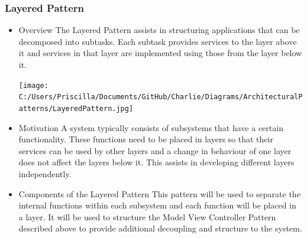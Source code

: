 \documentclass{article}
\begin{document}
\subsubsection{Layered Pattern}
\begin{itemize}
\item{Overview}
\newline
The Layered Pattern assists in structuring applications that can be decomposed into subtasks. Each subtask provides services to the layer above it and services in that layer are implemented using those from the layer below it.
\newline
\begin{minipage}{\linewidth} 
\centering
\texttt{[image: C:/Users/Priscilla/Documents/GitHub/Charlie/Diagrams/ArchitecturalPatterns/LayeredPattern.jpg]}
\end{minipage}
\item{Motivation}
\newline
A system typically consists of subsystems that have a certain functionality. These functions need to be placed in layers so that their services can be used by other layers and a change in behaviour of one layer does not affect the layers below it. This assists in developing different layers independently. 

\item{Components of the Layered Pattern}
\newline
This pattern will be used to separate the internal functions within each subsystem and each function will be placed in a layer. It will be used to structure the Model View Controller Pattern described above to provide additional decoupling and structure to the system.
\newline

\end{itemize}
\end{document}
